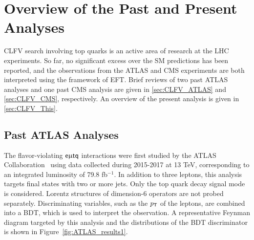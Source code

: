 \chapter{Overview of the Past and Present Analyses}
\label{chap:History}

\ac{CLFV} search involving top quarks is an active area of research at the \ac{LHC} experiments. So far, no significant excess over the \ac{SM} predictions has been reported, and the observations from the \ac{ATLAS} and \ac{CMS} experiments are both interpreted using the framework of \ac{EFT}. Brief reviews of two past \ac{ATLAS} analyses and one past \ac{CMS} analysis are given in \autoref{sec:CLFV_ATLAS} and \autoref{sec:CLFV_CMS}, respectively. An overview of the present analysis is given in \autoref{sec:CLFV_This}.

\section{Past ATLAS Analyses}
\label{sec:CLFV_ATLAS}

The flavor-violating $\textsf{e}\upmu\textsf{t{q}}$ interactions were first studied by the \ac{ATLAS} Collaboration~\cite{ATLAS-CONF-2018-044} using data collected during 2015-2017 at 13 TeV, corresponding to an integrated luminosity of 79.8 fb$^{-1}$. In addition to three leptons, this analysis targets final states with two or more jets. Only the top quark decay signal mode is considered. Lorentz structures of dimension-6 operators are not probed separately. Discriminating variables, such as the $p_{\textsf{T}}$ of the leptons, are combined into a \ac{BDT}, which is used to interpret the observation. A representative Feynman diagram targeted by this analysis and the distributions of the \ac{BDT} discriminator is shown in Figure~\ref{fig:ATLAS_results1}.

